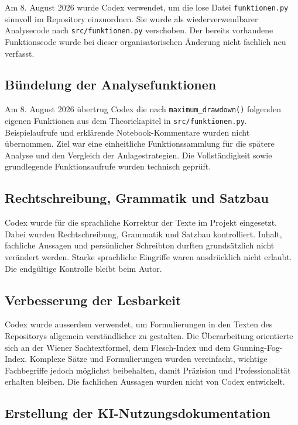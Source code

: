 \documentclass[
  ngerman,
  a4paper,
  DIV=11,
  oneside]{scrreprt}
\begin{document}
Am 8. August 2026 wurde Codex verwendet, um die lose Datei
\texttt{funktionen.py} sinnvoll im Repository einzuordnen. Sie wurde als
wiederverwendbarer Analysecode nach \texttt{src/funktionen.py}
verschoben. Der bereits vorhandene Funktionscode wurde bei dieser
organisatorischen Änderung nicht fachlich neu verfasst.

\subsection{Bündelung der
Analysefunktionen}\label{buxfcndelung-der-analysefunktionen}

Am 8. August 2026 übertrug Codex die nach \texttt{maximum\_drawdown()}
folgenden eigenen Funktionen aus dem Theoriekapitel in
\texttt{src/funktionen.py}. Beispielaufrufe und erklärende
Notebook-Kommentare wurden nicht übernommen. Ziel war eine einheitliche
Funktionssammlung für die spätere Analyse und den Vergleich der
Anlagestrategien. Die Vollständigkeit sowie grundlegende
Funktionsaufrufe wurden technisch geprüft.

\subsection{Rechtschreibung, Grammatik und
Satzbau}\label{rechtschreibung-grammatik-und-satzbau}

Codex wurde für die sprachliche Korrektur der Texte im Projekt
eingesetzt. Dabei wurden Rechtschreibung, Grammatik und Satzbau
kontrolliert. Inhalt, fachliche Aussagen und persönlicher Schreibton
durften grundsätzlich nicht verändert werden. Starke sprachliche
Eingriffe waren ausdrücklich nicht erlaubt. Die endgültige Kontrolle
bleibt beim Autor.

\subsection{Verbesserung der
Lesbarkeit}\label{verbesserung-der-lesbarkeit}

Codex wurde ausserdem verwendet, um Formulierungen in den Texten des
Repositorys allgemein verständlicher zu gestalten. Die Überarbeitung
orientierte sich an der Wiener Sachtextformel, dem Flesch-Index und dem
Gunning-Fog-Index. Komplexe Sätze und Formulierungen wurden vereinfacht,
wichtige Fachbegriffe jedoch möglichst beibehalten, damit Präzision und
Professionalität erhalten bleiben. Die fachlichen Aussagen wurden nicht
von Codex entwickelt.

\subsection{Erstellung der
KI-Nutzungsdokumentation}\label{erstellung-der-ki-nutzungsdokumentation}
\end{document}
